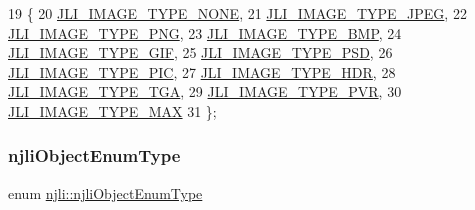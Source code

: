 \begin{DoxyCode}
19   \{
20     \mbox{\hyperlink{namespacenjli_a709a24b63b768ce1cdff54f7f48d3c0ba8ff0450751411797422b34c8359ab88b}{JLI\_IMAGE\_TYPE\_NONE}},
21     \mbox{\hyperlink{namespacenjli_a709a24b63b768ce1cdff54f7f48d3c0baa663b1e8f053ef637e5fbab26f3d62ce}{JLI\_IMAGE\_TYPE\_JPEG}},
22     \mbox{\hyperlink{namespacenjli_a709a24b63b768ce1cdff54f7f48d3c0ba1bce22b2205898667daf43a32d4dcc0c}{JLI\_IMAGE\_TYPE\_PNG}},
23     \mbox{\hyperlink{namespacenjli_a709a24b63b768ce1cdff54f7f48d3c0ba6c077185b17a5ad1bb4b521162306c04}{JLI\_IMAGE\_TYPE\_BMP}},
24     \mbox{\hyperlink{namespacenjli_a709a24b63b768ce1cdff54f7f48d3c0ba369c6c877fedaeac85b1fd0e7c86eca2}{JLI\_IMAGE\_TYPE\_GIF}},
25     \mbox{\hyperlink{namespacenjli_a709a24b63b768ce1cdff54f7f48d3c0ba44567b6e9384a453ce67c6185f23b8a2}{JLI\_IMAGE\_TYPE\_PSD}},
26     \mbox{\hyperlink{namespacenjli_a709a24b63b768ce1cdff54f7f48d3c0bad40e11586edea130d1763cb3cb5a2cb7}{JLI\_IMAGE\_TYPE\_PIC}},
27     \mbox{\hyperlink{namespacenjli_a709a24b63b768ce1cdff54f7f48d3c0baf7370a388c8d303d6acfdfcf184f4b99}{JLI\_IMAGE\_TYPE\_HDR}},
28     \mbox{\hyperlink{namespacenjli_a709a24b63b768ce1cdff54f7f48d3c0bab549f4c12f970bff516a48d261358db4}{JLI\_IMAGE\_TYPE\_TGA}},
29     \mbox{\hyperlink{namespacenjli_a709a24b63b768ce1cdff54f7f48d3c0bafb27762a5d22577b3112f0a91707abf8}{JLI\_IMAGE\_TYPE\_PVR}},
30     \mbox{\hyperlink{namespacenjli_a709a24b63b768ce1cdff54f7f48d3c0ba23a54cca0a7ae8917159f1e7649e4020}{JLI\_IMAGE\_TYPE\_MAX}}
31   \};
\end{DoxyCode}
\mbox{\label{namespacenjli_a6d56d4fbaf89fcf3e3d32839df05b444}} 
\subsubsection{\texorpdfstring{njli\+Object\+Enum\+Type}{njliObjectEnumType}}
{\footnotesize\ttfamily enum \mbox{\hyperlink{namespacenjli_a6d56d4fbaf89fcf3e3d32839df05b444}{njli\+::njli\+Object\+Enum\+Type}}}

